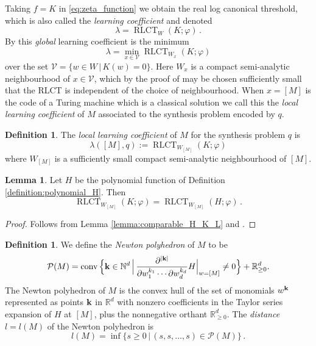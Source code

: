 \documentclass[english,letter paper,12pt,reqno]{article}
\theoremstyle{definition}
\newtheorem{lemma}[theorem]{Lemma}
\newtheorem{definition}[theorem]{Definition}
\def\be{\begin{equation}}
\def\ee{\end{equation}}
\def\l{\,|\,}
\begin{document}
Taking $f = K$ in \eqref{eq:zeta_function} we obtain the real log canonical threshold, which is also called the \emph{learning coefficient} \cite[\S 7]{watanabeAlgebraicGeometryStatistical2009} and denoted
\[
\lambda = \operatorname{RLCT}_W(K ; \varphi)\,.
\]
By \cite[Proposition 3.9]{lin2011algebraic} this \emph{global} learning coefficient is the minimum
\[
\lambda = \min_{x \in \mathcal{V}} \operatorname{RLCT}_{W_x}( K ; \varphi )
\]
over the set $\mathcal{V} = \{ w \in W \l K(w) = 0 \}$. Here $W_x$ is a compact semi-analytic neighbourhood of $x \in \mathcal{V}$, which by the proof of \cite[Proposition 3.9]{lin2011algebraic} may be chosen sufficiently small that the RLCT is independent of the choice of neighbourhood. When $x = [M]$ is the code of a Turing machine which is a classical solution we call this the \emph{local learning coefficient} of $M$ associated to the synthesis problem encoded by $q$.


\begin{definition}\label{defn:local_learning_coefficient}
The \emph{local learning coefficient} of $M$ for the synthesis problem $q$ is 
\be
\lambda([M], q) := \operatorname{RLCT}_{W_{[M]}}( K ; \varphi )
\ee
where $W_{[M]}$ is a sufficiently small compact semi-analytic neighbourhood of $[M]$.
\end{definition}

\begin{lemma} Let $H$ be the polynomial function of Definition \ref{definition:polynomial_H}. Then
\[
\operatorname{RLCT}_{W_{[M]}}( K ; \varphi ) = \operatorname{RLCT}_{W_{[M]}}( H ; \varphi)\,.
\]
\end{lemma}
\begin{proof}
Follows from Lemma \ref{lemma:comparable_H_K_L} and \cite[\S 7]{watanabeAlgebraicGeometryStatistical2009}.
\end{proof}

\begin{definition} We define the \emph{Newton polyhedron} of $M$ to be
\be
\mathcal{P}(M) = \operatorname{conv}\Big\{ \bold{k} \in \mathbb{N}^d \,\Big|\, \frac{\partial^{|\bold{k}|}}{ \partial w_1^{k_1} \cdots \partial w_d^{k_d}} H \Bigr|_{w = [M]} \neq 0 \Big\} + \mathbb{R}_{\ge 0}^d.
\ee
The Newton polyhedron of $M$ is the convex hull of the set of monomials $w^{\bold{k}}$ represented as points $\bold{k}$ in $\mathbb{R}^d$ with nonzero coefficients in the Taylor series expansion of $H$ at $[M]$, plus the nonnegative orthant $\mathbb{R}_{\ge 0}^d$. The \emph{distance} $l = l(M)$ of the Newton polyhedron is
\be
l(M) = \inf\{ s \ge 0 \l (s,s,\ldots,s) \in \mathcal{P}(M) \}\,.
\ee
\end{definition}
\end{document}
